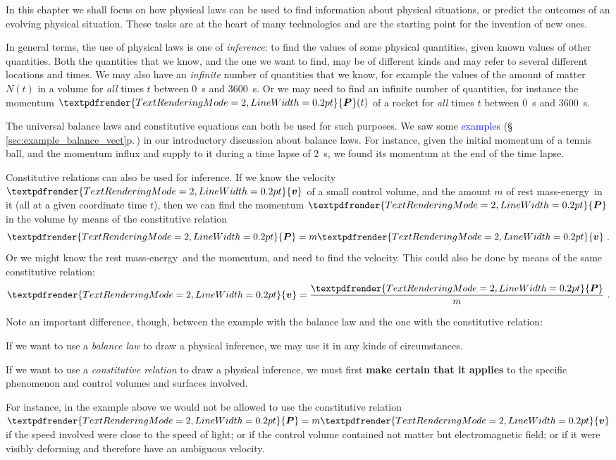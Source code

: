 \documentclass[a4paper,12pt,%
onecolumn,oneside,%
british%
]{memoir}
\renewcommand*{\bm}[1]{\textpdfrender{TextRenderingMode=2,LineWidth=0.2pt}{\boldsymbol{#1}}}
\renewcommand*{\|}[1][]{\nonscript\:#1\vert\nonscript\:\mathopen{}}
\newcommand*{\sect}{\S}%
\renewcommand*{\autoref}[3][\sect\,\ref]{\textcolor{blue}{#3} {\color{blue}\scriptsize(\faIcon[regular]{eye}\;#1{#2}\;p.\,\pageref{#2})}}
\newcommand*{\masse}{mass-energy}
\newcommand*{\yv}{\bm{v}}
\newcommand*{\yN}{N}
\newcommand*{\ym}{m}%
\newcommand*{\yP}{\bm{P}}
\begin{document}
In this chapter we shall focus on how physical laws can be used to find information about physical situations, or predict the outcomes of an evolving physical situation. These tasks are at the heart of many technologies and are the starting point for the invention of new ones.

\medskip

In general terms, the use of physical laws is one of \emph{inference}: to find the values of some physical quantities, given known values of other quantities. Both the quantities that we know, and the one we want to find, may be of different kinds and may refer to several different locations and times. We may also have an \emph{infinite} number of quantities that we know, for example the values of the amount of matter $\yN(t)$ in a volume for \emph{all} times $t$ between \qty{0}{s} and \qty{3600}{s}. Or we may need to find  an infinite number of quantities, for instance the momentum $\yP(t)$ of a rocket for \emph{all} times $t$ between \qty{0}{s} and \qty{3600}{s}.

\medskip

The universal balance laws and constitutive equations can both be used for such purposes. We saw some \autoref{sec:example_balance_vect}{examples} in our introductory discussion about balance laws. For instance, given the initial momentum of a tennis ball, and the momentum influx and supply to it during a time lapse of \qty{2}{s}, we found its momentum at the end of the time lapse.

Constitutive relations can also be used for inference. If we know the velocity $\yv$ of a small control volume, and the amount $\ym$ of rest \masse\ in it (all at a given coordinate time $t$), then we can find the momentum $\yP$ in the volume by means of the constitutive relation
\begin{equation*}
  \yP = \ym\yv \ .
\end{equation*}
Or we might know the rest \masse\ and the momentum, and need to find the velocity. This could also be done by means of the same constitutive relation:
\begin{equation*}
  \yv = \frac{\yP}{\ym} \ .
\end{equation*}

Note an important difference, though, between the example with the balance law and the one with the constitutive relation:
%
\begin{warning}
  If we want to use a \emph{balance law} to draw a physical inference, we may use it in any kinds of circumstances.

  \smallskip

  If we want to use a \emph{constitutive relation} to draw a physical inference, we must first \textbf{make certain that it applies} to the specific phenomenon and control volumes and surfaces involved.
\end{warning}
%
For instance, in the example above we would not be allowed to use the constitutive relation $\yP = \ym\yv$  if the speed involved were close to the speed of light; or if the control volume contained not matter but electromagnetic field; or if it were visibly deforming and therefore have an ambiguous velocity.
\end{document}
